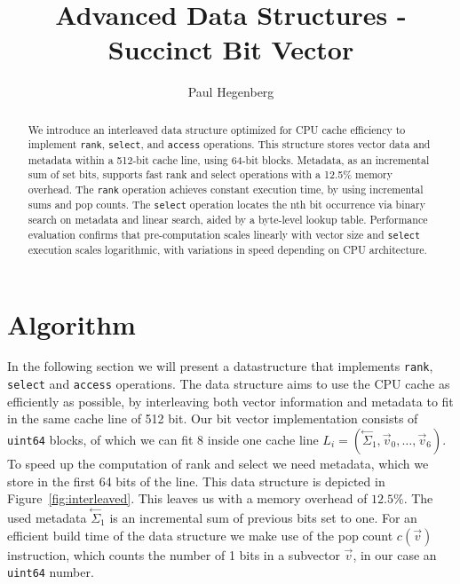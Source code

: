 \documentclass[a4paper,UKenglish,cleveref, autoref, thm-restate]{lipics-v2021}
\title{Advanced Data Structures - Succinct Bit Vector}
\author{Paul Hegenberg}{Karlsruher Institut für Technologie, Germany \and \url{https://blog.hegenberg.dev} }{urlgh@student.kit.edu}{}{}%
\def\code#1{\texttt{#1}}
\newcommand\prevsum[0]{\ensuremath{\overset{\leftarrow}{\Sigma}_1}}
\begin{document}
\maketitle

\begin{abstract}
We introduce an interleaved data structure optimized for CPU cache efficiency to implement \code{rank},
\code{select}, and \code{access} operations. This structure stores vector data and metadata within a
512-bit cache line, using 64-bit blocks. Metadata, as an incremental sum of set bits, supports fast 
rank and select operations with a 12.5\% memory overhead.
The \code{rank} operation achieves constant execution time, by using incremental sums and pop counts.
The \code{select} operation locates the nth bit occurrence via binary search on metadata and linear search,
aided by a byte-level lookup table.
Performance evaluation confirms that pre-computation scales linearly with vector size and \code{select}
execution scales logarithmic, with variations in speed depending on CPU architecture.
\end{abstract}

\section{Algorithm}
In the following section we will present a datastructure
that implements \code{rank}, \code{select} and \code{access} operations.
The data structure aims to use the CPU cache as efficiently as possible, by interleaving both
vector information and metadata to fit in the same cache line of 512 bit.
Our bit vector implementation consists of \code{uint64} blocks, of which we can fit 8 inside one cache line
$L_i = (\prevsum, \vec{v}_0, \dots, \vec{v}_6)$.
To speed up the computation of rank and select we need metadata, which we store in the first
64 bits of the line.
This data structure is depicted in Figure~\ref{fig:interleaved}. 
This leaves us with a memory overhead of $12.5\%$. The used metadata $\prevsum$ is an incremental sum of previous bits
set to one. For an efficient build time of the data structure we make use of the pop count $c(\vec{v})$
instruction, which counts the number of 1 bits in a subvector $\vec{v}$, in our case an \code{uint64} number.
\end{document}
